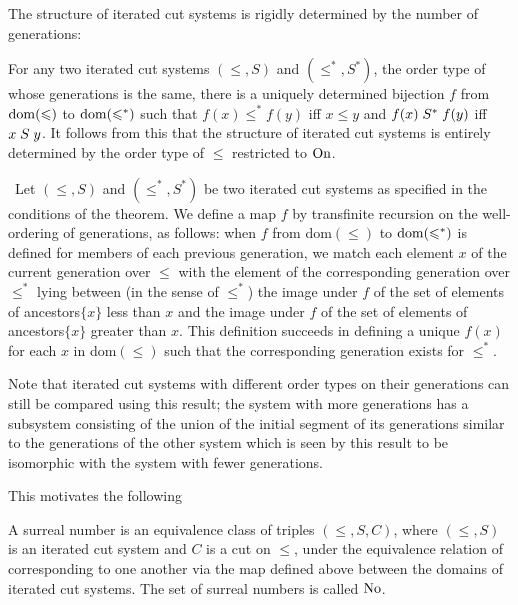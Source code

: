 The structure of iterated cut systems is rigidly determined by the
number of generations:

\begin{thm}
 For any two iterated cut systems $(\leq,S)$ and
 $(\leq^*,S^*)$, the order type of whose generations is the
 same, there is a uniquely determined bijection $f$ from $\mathop{\mathrm{dom}}(\leqslant)$ to
 $\mathop{\mathrm{dom}}(\leqslant^*)$ such that $f(x) \leq^* f(y)$ iff $x \leq y$ and $f(x)
 \mathrel{S}^* f(y)$ iff $x \mathrel{S} y$.  It follows from this that the structure of
 iterated cut systems is entirely determined by the order type of
 $\leq$ restricted to $\mathrm{On}$.
\end{thm}

\preuve\ Let $(\leq,S)$ and $(\leq^*,S^*)$ be two iterated cut
systems as specified in the conditions of the theorem.  We define a
map $f$ by transfinite recursion on the
well-ordering of generations, 
as follows: when $f$ from dom$(\leq)$ to $\mathop{\mathrm{dom}}(\leqslant^*)$ is defined for
members of each previous generation, we match each element $x$ of the
current generation over $\leq$ with the element of the corresponding
generation over $\leq^*$ lying between (in the sense of $\leq^*$) the
image under $f$ of the set of elements of ancestors$\{x\}$ less than
$x$ and the image under $f$ of the set of elements of ancestors$\{x\}$
greater than $x$.  This definition succeeds in defining a unique
$f(x)$ for each $x$ in dom$(\leq)$ such that the corresponding
generation exists for $\leq^*$.
\finpreuve

Note that iterated cut systems with different order types on
their generations can still be compared using this result; the system with
more generations has a subsystem consisting of the union of
the initial segment of its generations similar
to the generations of the other system which is seen by this result to be
isomorphic with the system with fewer generations.

This motivates the following

\begin{definition}
 A {\upshape surreal number} is an equivalence
 class of triples 
 $(\leq,S,C)$, where $(\leq,S)$ is an iterated cut system and $C$ is a cut on
 $\leq$, 
 under the equivalence relation of corresponding to one another via the
 map defined above between the domains of iterated cut systems.
 The set of surreal numbers is called $\mathrm{No}$.
\end{definition}

